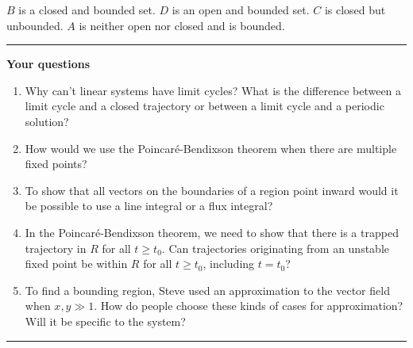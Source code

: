 \documentclass[12pt,letterpaper,noanswers]{exam}
\begin{document}


$B$ is a closed and bounded set.  $D$ is an open and bounded set.  $C$ is closed but unbounded.  $A$ is neither open nor closed and is bounded.

\vspace{0.2cm}

\hrule
\vspace{0.2cm}

\noindent\textbf{Your questions}
\begin{enumerate}
    \item Why can't linear systems have limit cycles?  What is the difference between a limit cycle and a closed trajectory or between a limit cycle and a periodic solution?
    \item How would we use the Poincar\'e-Bendixson theorem when there are multiple fixed points?
    \item To show that all vectors on the boundaries of a region point inward would it be possible to use a line integral or a flux integral?
    \item In the Poincar\'e-Bendixson theorem, we need to show that there is a trapped trajectory in $R$ for all $t\geq t_0$.  Can trajectories originating from an unstable fixed point be within $R$ for all $t\geq t_0$, including $t = t_0$?
    \item To find a bounding region, Steve used an approximation to the vector field when $x,y\gg 1$.  How do people choose these kinds of cases for approximation?  Will it be specific to the system?
\end{enumerate}

\vspace{0.2cm}
\hrule
\vspace{0.2cm}
\end{document}
